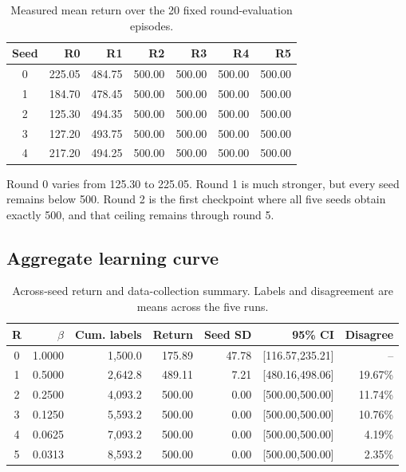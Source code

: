 \documentclass[11pt]{article}
\begin{document}
\begin{table}[ht]
\centering
\caption{Measured mean return over the 20 fixed round-evaluation episodes.}
\small
\begin{tabular}{@{}crrrrrr@{}}
\toprule
Seed & R0 & R1 & R2 & R3 & R4 & R5 \\
\midrule
0 & 225.05 & 484.75 & 500.00 & 500.00 & 500.00 & 500.00 \\
1 & 184.70 & 478.45 & 500.00 & 500.00 & 500.00 & 500.00 \\
2 & 125.30 & 494.35 & 500.00 & 500.00 & 500.00 & 500.00 \\
3 & 127.20 & 493.75 & 500.00 & 500.00 & 500.00 & 500.00 \\
4 & 217.20 & 494.25 & 500.00 & 500.00 & 500.00 & 500.00 \\
\bottomrule
\end{tabular}
\end{table}

Round 0 varies from 125.30 to 225.05. Round 1 is much stronger, but every seed remains below 500. Round 2 is the first checkpoint where all five seeds obtain exactly 500, and that ceiling remains through round 5.

\subsection{Aggregate learning curve}

\begin{table}[ht]
\centering
\caption{Across-seed return and data-collection summary. Labels and disagreement are means across the five runs.}
\small
\begin{tabular}{@{}crrrrrr@{}}
\toprule
R & $\beta$ & Cum. labels & Return & Seed SD & 95\% CI & Disagree \\
\midrule
0 & 1.0000 & 1,500.0 & 175.89 & 47.78 & [116.57,235.21] & -- \\
1 & 0.5000 & 2,642.8 & 489.11 & 7.21 & [480.16,498.06] & 19.67\% \\
2 & 0.2500 & 4,093.2 & 500.00 & 0.00 & [500.00,500.00] & 11.74\% \\
3 & 0.1250 & 5,593.2 & 500.00 & 0.00 & [500.00,500.00] & 10.76\% \\
4 & 0.0625 & 7,093.2 & 500.00 & 0.00 & [500.00,500.00] & 4.19\% \\
5 & 0.0313 & 8,593.2 & 500.00 & 0.00 & [500.00,500.00] & 2.35\% \\
\bottomrule
\end{tabular}
\end{table}
\end{document}
